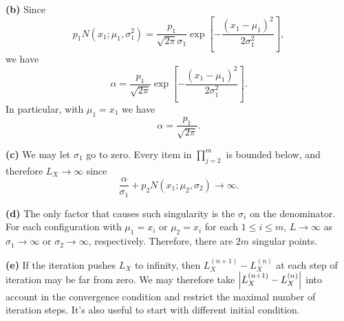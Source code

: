 \documentclass{article}
\makeatletter
\newcommand*{\shifttext}[1]{%
  \settowidth{\@tempdima}{#1}%
  \hspace{-\@tempdima}#1%
}
\newcommand{\plabel}[1]{%
\shifttext{\textbf{#1}\quad}%
}
\makeatother
\begin{document}
\plabel{(b)}%
Since
\[ p_1 N(x_1;\mu_1,\sigma_1^2) = \frac{p_1}{\sqrt{2\pi}\sigma_1} \exp[-\frac{(x_1-\mu_1)^2}{2\sigma_1^2}], \]
we have
\[ \alpha = \frac{p_1}{\sqrt{2\pi}} \exp[-\frac{(x_1-\mu_1)^2}{2\sigma_1^2}]. \]
In particular, with $\mu_1 = x_1$ we have
\[ \alpha = \frac{p_1}{\sqrt{2\pi}}. \]

\plabel{(c)}%
We may let $\sigma_1$ go to zero.
Every item in $\prod_{j=2}^m$ is bounded below, and therefore $L_X\rightarrow \infty$ since
\[ \frac{\alpha}{\sigma_1} + p_2 N(x_1;\mu_2,\sigma_2) \rightarrow \infty. \]

\plabel{(d)}%
The only factor that causes such singularity is the $\sigma_i$ on the denominator.
For each configuration with $\mu_1 = x_i$ or $\mu_2 = x_i$ for each $1\le i \le m$, $L\rightarrow \infty$ as $\sigma_1\rightarrow \infty$ or $\sigma_2\rightarrow \infty$, respectively.
Therefore, there are $2m$ singular points.

\plabel{(e)}%
If the iteration pushes $L_X$ to infinity, then $L_X^{(n+1)} - L_X^{(n)}$ at each step of iteration may be far from zero.
We may therefore take $\abs{L_X^{(n+1)} - L_X^{(n)}}$ into account in the convergence condition and restrict the maximal number of iteration steps.
It's also useful to start with different initial condition.

% 
% 
\end{document}
